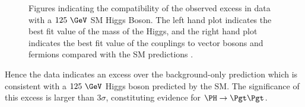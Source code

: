 \begin{figure}[h!]
\caption[Figures indicating the compatibility of the observed excess in data
with a $125~\GeV$ SM Higgs Boson.]{Figures indicating the compatibility of the observed excess in data
with a $125~\GeV$ SM Higgs Boson. The left hand plot indicates the best fit
value of the mass of the Higgs, and the right hand plot indicates the best fit
value of the couplings to vector bosons and fermions compared with the SM
predictions \cite{HIG-13-004}.}
\label{fig:results-properties}
\end{figure}

Hence the data indicates an excess over the background-only prediction which is
consistent with a $125~\GeV$ Higgs boson predicted by the SM. The
significance of this excess is larger than $3\sigma$, constituting evidence for
$\HToTauTau$.


